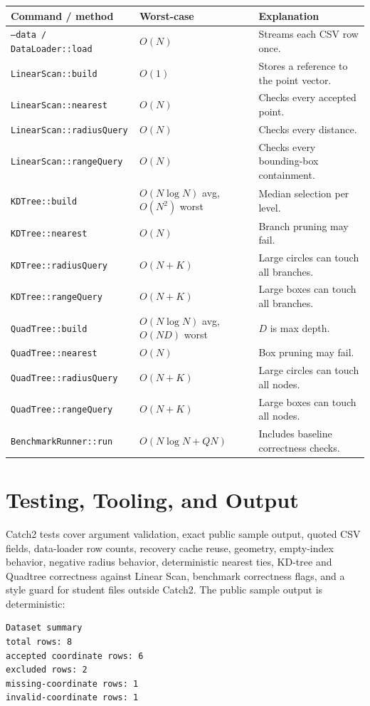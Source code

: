 \documentclass[12pt]{article}
\begin{document}
\begin{center}
\small
\begin{tabular}{L{2.1in}L{1.45in}L{2.85in}}
\toprule
Command / method & Worst-case & Explanation \\
\midrule
\texttt{--data / DataLoader::load} & $O(N)$ & Streams each CSV row once.\\
\texttt{LinearScan::build} & $O(1)$ & Stores a reference to the point vector.\\
\texttt{LinearScan::nearest} & $O(N)$ & Checks every accepted point.\\
\texttt{LinearScan::radiusQuery} & $O(N)$ & Checks every distance.\\
\texttt{LinearScan::rangeQuery} & $O(N)$ & Checks every bounding-box containment.\\
\texttt{KDTree::build} & $O(N\log N)$ avg, $O(N^2)$ worst & Median selection per level.\\
\texttt{KDTree::nearest} & $O(N)$ & Branch pruning may fail.\\
\texttt{KDTree::radiusQuery} & $O(N+K)$ & Large circles can touch all branches.\\
\texttt{KDTree::rangeQuery} & $O(N+K)$ & Large boxes can touch all branches.\\
\texttt{QuadTree::build} & $O(N\log N)$ avg, $O(ND)$ worst & $D$ is max depth.\\
\texttt{QuadTree::nearest} & $O(N)$ & Box pruning may fail.\\
\texttt{QuadTree::radiusQuery} & $O(N+K)$ & Large circles can touch all nodes.\\
\texttt{QuadTree::rangeQuery} & $O(N+K)$ & Large boxes can touch all nodes.\\
\texttt{BenchmarkRunner::run} & $O(N\log N+QN)$ & Includes baseline correctness checks.\\
\bottomrule
\end{tabular}
\end{center}

\section{Testing, Tooling, and Output}
Catch2 tests cover argument validation, exact public sample output, quoted
CSV fields, data-loader row counts, recovery cache reuse, geometry, empty-index
behavior, negative radius behavior, deterministic nearest ties, KD-tree and
Quadtree correctness against Linear Scan, benchmark correctness flags, and a
style guard for student files outside Catch2. The public
sample output is deterministic:
\begin{verbatim}
Dataset summary
total rows: 8
accepted coordinate rows: 6
excluded rows: 2
missing-coordinate rows: 1
invalid-coordinate rows: 1
\end{verbatim}
\end{document}
